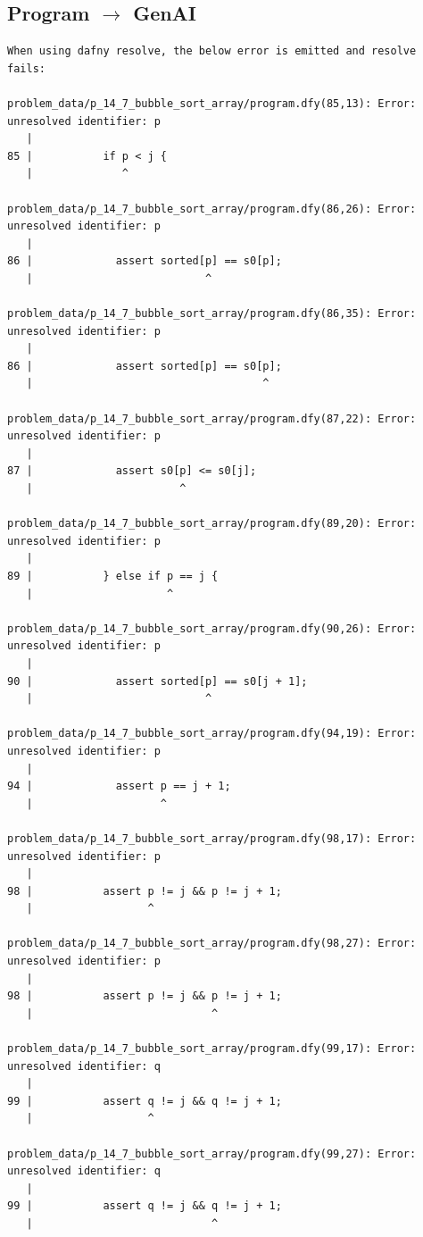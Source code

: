\documentclass{article}
\begin{document}
\subsection*{Program $\rightarrow$ GenAI}
\begin{lstlisting}
When using dafny resolve, the below error is emitted and resolve fails:

problem_data/p_14_7_bubble_sort_array/program.dfy(85,13): Error: unresolved identifier: p
   |
85 |           if p < j {
   |              ^

problem_data/p_14_7_bubble_sort_array/program.dfy(86,26): Error: unresolved identifier: p
   |
86 |             assert sorted[p] == s0[p];
   |                           ^

problem_data/p_14_7_bubble_sort_array/program.dfy(86,35): Error: unresolved identifier: p
   |
86 |             assert sorted[p] == s0[p];
   |                                    ^

problem_data/p_14_7_bubble_sort_array/program.dfy(87,22): Error: unresolved identifier: p
   |
87 |             assert s0[p] <= s0[j];
   |                       ^

problem_data/p_14_7_bubble_sort_array/program.dfy(89,20): Error: unresolved identifier: p
   |
89 |           } else if p == j {
   |                     ^

problem_data/p_14_7_bubble_sort_array/program.dfy(90,26): Error: unresolved identifier: p
   |
90 |             assert sorted[p] == s0[j + 1];
   |                           ^

problem_data/p_14_7_bubble_sort_array/program.dfy(94,19): Error: unresolved identifier: p
   |
94 |             assert p == j + 1;
   |                    ^

problem_data/p_14_7_bubble_sort_array/program.dfy(98,17): Error: unresolved identifier: p
   |
98 |           assert p != j && p != j + 1;
   |                  ^

problem_data/p_14_7_bubble_sort_array/program.dfy(98,27): Error: unresolved identifier: p
   |
98 |           assert p != j && p != j + 1;
   |                            ^

problem_data/p_14_7_bubble_sort_array/program.dfy(99,17): Error: unresolved identifier: q
   |
99 |           assert q != j && q != j + 1;
   |                  ^

problem_data/p_14_7_bubble_sort_array/program.dfy(99,27): Error: unresolved identifier: q
   |
99 |           assert q != j && q != j + 1;
   |                            ^


\end{lstlisting}
\end{document}
